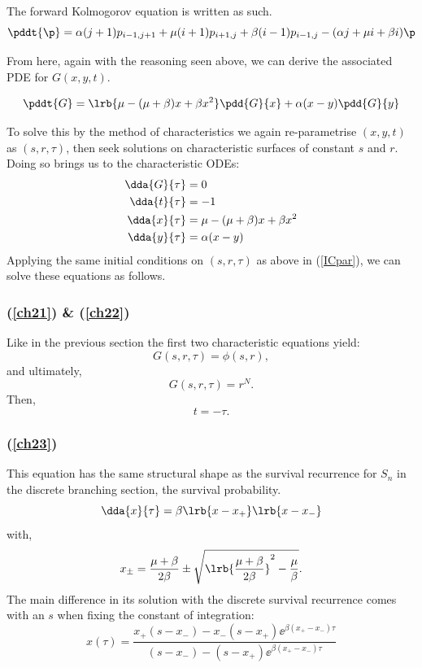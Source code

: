The forward Kolmogorov equation is written as such.
\begin{equation*}
\label{FK3}
\pddt{\p } = \alpha(j + 1) p_{i-1,j+1} + \mu(i+1)p_{i+1,j}  +  \beta(i-1)p_{i-1,j}    -  (\alpha j + \mu i+\beta i) \p
\end{equation*}

From here, again with the reasoning seen above, we can derive the associated PDE for $G(x,y,t)$.

\begin{equation}
\pddt{G} = \lrb{\mu - (\mu+ \beta)x + \beta x^2}\pdd{G}{x} + \alpha(x-y)\pdd{G}{y}
\end{equation}

To solve this by the method of characteristics we again re-parametrise $(x,y,t)$ as $(s,r,\tau)$, then seek solutions on characteristic surfaces of constant $s$ and $r$. Doing so brings us to the characteristic ODEs:
\begin{align}
\dda{G}{\tau} &= 0\label{ch21}\\
\dda{t}{\tau} &= -1\label{ch22}\\
\dda{x}{\tau} &= \mu-(\mu+\beta)x + \beta x^2\label{ch23}\\
\dda{y}{\tau} &= \alpha(x-y)\label{ch24}
\end{align}
Applying the same initial conditions on $(s,r,\tau)$ as above in (\ref{ICpar}), we can solve these equations as follows.

\subsubsection*{(\ref{ch21}) \& (\ref{ch22})}
Like in the previous section the first two characteristic equations yield:
$$G(s,r,\tau) = \phi(s,r),$$
and ultimately,
\begin{equation}
\label{gngngn}
G(s,r,\tau) = r^N.
\end{equation}
Then,
$$t = -\tau.$$


\subsubsection*{(\ref{ch23})}
This equation has the same structural shape as the survival recurrence for $S_n$ in the discrete branching section, the survival probability.
$$\dda{x}{\tau} = \beta\lrb{x-x_+}\lrb{x-x_-}$$
with,
$$x_{\pm} = \frac{\mu + \beta}{2\beta} \pm \sqrt{\lrb{\frac{\mu + \beta}{2\beta}}^2 - \frac{\mu}{\beta}}.$$
The main difference in its solution with the discrete survival recurrence comes with an $s$ when fixing the constant of integration:
\begin{equation}
x(\tau) = \frac{x_+(s-x_-) - x_-(s-x_+)\ee^{\beta(x_+-x_-)\tau}}{(s-x_-) - (s-x_+)\ee^{\beta(x_+-x_-) \tau}}
\label{xabd}
\end{equation}


